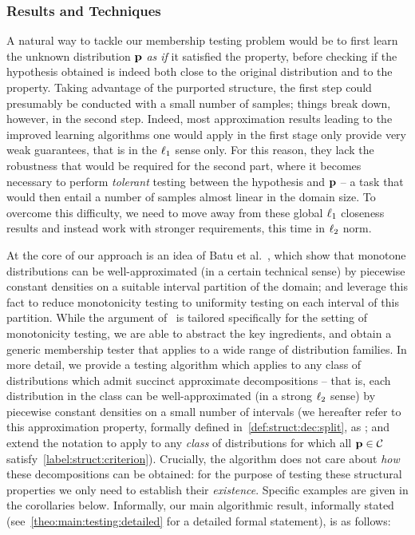 \subsubsection{Results and Techniques}

A natural way to tackle our membership testing problem would be to first learn the unknown distribution $\D$ \emph{as if} it satisfied the property, before checking if the hypothesis obtained is indeed both close to the original distribution and to the property. Taking advantage of the purported structure, the first step could presumably be conducted with a small number of samples; things break down, however, in the second step. 
Indeed, most approximation results leading to the improved learning algorithms one would apply in the first stage only provide very weak guarantees, that is in the $\lp[1]$ sense only. For this reason, they lack the robustness that would be required for the second part, where it becomes necessary to perform \emph{tolerant} testing between the hypothesis and $\D$ -- a task that would then entail a number of samples almost linear in the domain size. To overcome this difficulty, we need to move away from these global $\lp[1]$ closeness results and instead work with stronger requirements, this time in $\lp[2]$ norm. 

At the core of our approach is an idea of Batu et al.~\cite{BKR:04}, which show that monotone distributions can be well-approximated (in a certain technical sense) 
by piecewise constant densities on a suitable interval partition of the domain; and leverage this fact to reduce monotonicity testing to uniformity testing on each interval of this partition. 
While the argument of~\cite{BKR:04} is tailored specifically for the setting of monotonicity testing, we are able to abstract the key ingredients, and obtain a generic membership tester that applies to a wide range of distribution families. In more detail, we provide a testing algorithm which applies to any class of distributions which admit succinct approximate decompositions -- that is, each distribution in the class can be well-approximated (in a strong $\lp[2]$ sense) by piecewise constant densities on a small number of intervals (we hereafter refer to this approximation property, formally defined in~\cref{def:struct:dec:split}, as ; and extend the notation to apply to any \emph{class} \class of distributions for which all $\D\in\class$ satisfy~\eqref{label:struct:criterion}). 
Crucially, the algorithm does not care about \emph{how} these decompositions can be obtained: 
for the purpose of testing these structural properties we only need to establish their \emph{existence}. Specific examples are given in the corollaries below.
Informally, our main algorithmic result, informally stated (see~\cref{theo:main:testing:detailed} for a detailed formal statement), is as follows:

